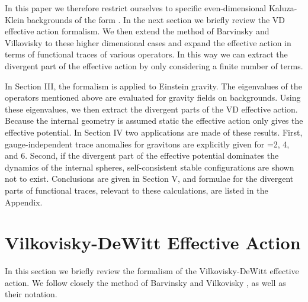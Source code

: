 \documentclass[a4paper,aps,preprint,groupedaddress,showpacs]{revtex4}
\begin{document}
In this paper we therefore restrict ourselves to specific
even-dimensional Kaluza-Klein backgrounds of the form
\coordHE{}. In the next section we briefly review the VD effective action
formalism. We 
then extend the method of Barvinsky and Vilkovisky to these higher dimensional cases and 
expand
the effective action in terms of functional traces of 
various operators. In this way we can extract
the divergent part of the effective action by only considering a 
finite number of terms.

In Section III, the formalism is applied to Einstein gravity. 
The eigenvalues of the operators \cite{RO,CK2}
mentioned above are evaluated for
gravity fields on \coordHE{} backgrounds. Using
these eigenvalues, we then extract the divergent parts of the
VD effective action. Because the internal geometry is assumed static the effective action only
gives the effective potential. 
In Section IV two applications are made of these results. First, 
gauge-independent trace anomalies for gravitons are explicitly 
given for \coordHE{}=2, 4, and 6. Second, if the divergent part of the effective potential dominates
the dynamics of the internal spheres, self-consistent stable configurations
are shown not to exist. 
Conclusions are given in Section V,
and formulae for the divergent parts
of functional traces, relevant to these calculations,
are listed in the Appendix.


\section{Vilkovisky-DeWitt Effective Action}

In this section we briefly review the formalism of the 
Vilkovisky-DeWitt effective action. 
We follow closely the method
of Barvinsky and Vilkovisky \cite{BV}, as well as 
their notation. 
\end{document}
